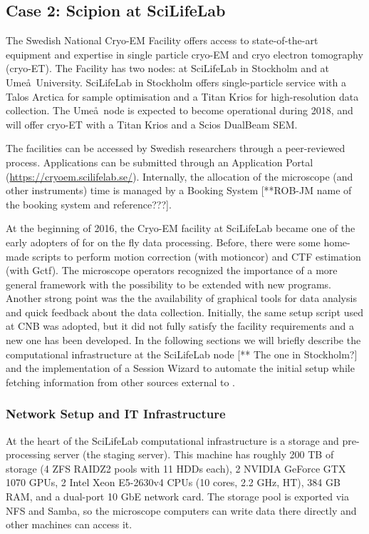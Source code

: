 
\subsection{Case 2: Scipion at SciLifeLab}

The Swedish National Cryo-EM Facility offers access to state-of-the-art equipment and expertise in single particle cryo-EM and cryo electron tomography (cryo-ET). The Facility has two nodes: at SciLifeLab in Stockholm and at Ume\aa\ University. SciLifeLab in Stockholm offers single-particle service with a 
Talos Arctica for sample optimisation and a Titan Krios for high-resolution data collection. The Ume\aa\ node is expected to become operational during 2018, and will offer cryo-ET with a Titan Krios and a Scios DualBeam SEM.

The facilities can be accessed by Swedish researchers through 
a peer-reviewed process. Applications can be submitted through an Application Portal (\url{https://cryoem.scilifelab.se/}). %
Internally, the allocation of the microscope (and other instruments) time is managed by a Booking System [**ROB-JM name of the booking system and reference???]. 

At the beginning of 2016, the Cryo-EM facility at SciLifeLab became one of the early adopters of \scipion for on the fly data processing. Before, there were some home-made scripts to perform motion correction (with motioncor) and CTF estimation (with Gctf). The microscope operators recognized the importance of  
a more general framework with the possibility to be extended with new programs. Another strong point was the the availability of graphical tools for data analysis and quick feedback about the data collection. Initially, the same setup script used at CNB was adopted, but it did not fully satisfy the facility requirements and a new one has been developed. In the following sections we will briefly describe the computational infrastructure at the SciLifeLab node [** The one in  Stockholm?] and the implementation of a Session Wizard to automate the initial setup while fetching information from other sources external to \scipion. 

\subsubsection{Network Setup and IT Infrastructure}
At the heart of the SciLifeLab computational infrastructure is a storage and pre-processing server (the
staging server). This machine has roughly 200 TB of storage (4 ZFS RAIDZ2 pools
with 11 HDDs each), 2 NVIDIA GeForce GTX 1070 GPUs, 2 Intel Xeon E5-2630v4 CPUs
(10 cores, 2.2 GHz, HT), 384 GB RAM, and a dual-port 10 GbE network card. The
storage pool is exported via NFS and Samba, so the microscope computers can
write data there directly and other machines can access it.


